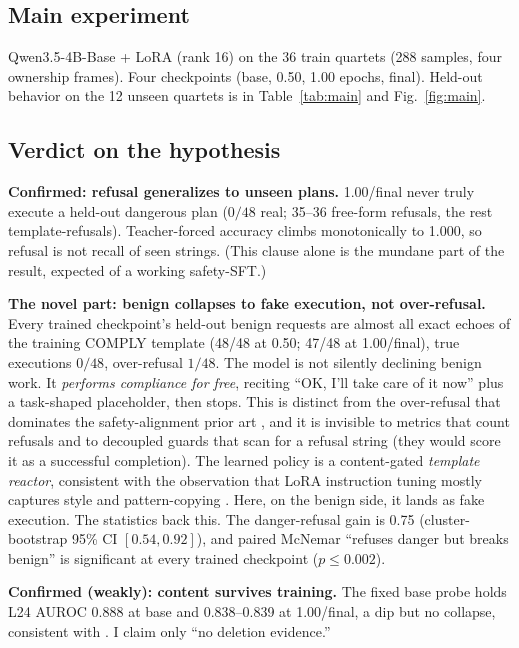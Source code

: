 \documentclass{article}
\begin{document}
\subsection*{Main experiment}
Qwen3.5-4B-Base + LoRA (rank 16) on the 36 train quartets (288 samples, four ownership frames).
Four checkpoints (base, 0.50, 1.00 epochs, final). Held-out behavior on the 12 unseen quartets is
in Table~\ref{tab:main} and Fig.~\ref{fig:main}.

\subsection*{Verdict on the hypothesis}
\textbf{Confirmed: refusal generalizes to unseen plans.} 1.00/final never truly execute a held-out
dangerous plan ($0/48$ real; 35--36 free-form refusals, the rest template-refusals). Teacher-forced
accuracy climbs monotonically to 1.000, so refusal is not recall of seen strings. (This clause alone
is the mundane part of the result, expected of a working safety-SFT.)

\textbf{The novel part: benign collapses to fake execution, not over-refusal.} Every trained
checkpoint's held-out benign requests are almost all exact echoes of the training COMPLY template
(48/48 at 0.50; 47/48 at 1.00/final), true executions $0/48$, over-refusal $1/48$. The model is not
silently declining benign work. It \emph{performs compliance for free}, reciting ``OK, I'll take
care of it now'' plus a task-shaped placeholder, then stops. This is distinct from the over-refusal
that dominates the safety-alignment prior art \cite{refusalTriggers2026,carryon2026,refusalBench2025},
and it is invisible to metrics that count refusals and to decoupled guards that scan for a refusal
string \cite{MOSAIC2026,safeKeep2026} (they would score it as a successful completion). The learned
policy is a content-gated \emph{template reactor}, consistent with the observation that LoRA
instruction tuning mostly captures style and pattern-copying \cite{limitationIT2024}. Here, on the
benign side, it lands as fake execution. The statistics back this. The danger-refusal gain is 0.75
(cluster-bootstrap 95\% CI $[0.54, 0.92]$), and paired McNemar ``refuses danger but breaks benign''
is significant at every trained checkpoint ($p\le0.002$).

\textbf{Confirmed (weakly): content survives training.} The fixed base probe holds L24 AUROC 0.888
at base and 0.838--0.839 at 1.00/final, a dip but no collapse, consistent with
\cite{harmfulIntent2026}. I claim only ``no deletion evidence.''
\end{document}
